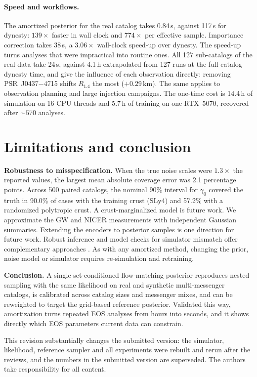 \documentclass{article}
\begin{document}
\paragraph{Speed and workflows.} The amortized posterior for the real catalog takes 0.84\,s, against 117\,s for dynesty: $139\times$ faster in wall clock and $774\times$ per effective sample. Importance correction takes 38\,s, a $3.06\times$ wall-clock speed-up over dynesty. The speed-up turns analyses that were impractical into routine ones. All 127 sub-catalogs of the real data take 24\,s, against 4.1\,h extrapolated from 127 runs at the full-catalog dynesty time, and give the influence of each observation directly: removing PSR~J0437$-$4715 shifts $R_{1.4}$ the most ($+0.29$\,km). The same applies to observation planning and large injection campaigns. The one-time cost is 14.4\,h of simulation on 16 CPU threads and 5.7\,h of training on one RTX~5070, recovered after ${\sim}570$ analyses.

\section{Limitations and conclusion}

\textbf{Robustness to misspecification.} When the true noise scales were $1.3\times$ the reported values, the largest mean absolute coverage error was 2.1 percentage points. Across 500 paired catalogs, the nominal 90\% interval for $\gamma_0$ covered the truth in 90.0\% of cases with the training crust (SLy4) and 57.2\% with a randomized polytropic crust. A crust-marginalized model is future work. We approximate the GW and NICER measurements with independent Gaussian summaries. Extending the encoders to posterior samples is one direction for future work. Robust inference and model checks for simulator mismatch offer complementary approaches \citep{ward2022robust,schmitt2024detecting}. As with any amortized method, changing the prior, noise model or simulator requires re-simulation and retraining.

\textbf{Conclusion.} A single set-conditioned flow-matching posterior reproduces nested sampling with the same likelihood on real and synthetic multi-messenger catalogs, is calibrated across catalog sizes and messenger mixes, and can be reweighted to target the grid-based reference posterior. Validated this way, amortization turns repeated EOS analyses from hours into seconds, and it shows directly which EOS parameters current data can constrain.

\begin{ack}
This revision substantially changes the submitted version: the simulator, likelihood, reference sampler and all experiments were rebuilt and rerun after the reviews, and the numbers in the submitted version are superseded. The authors take responsibility for all content.
\end{ack}
\end{document}
